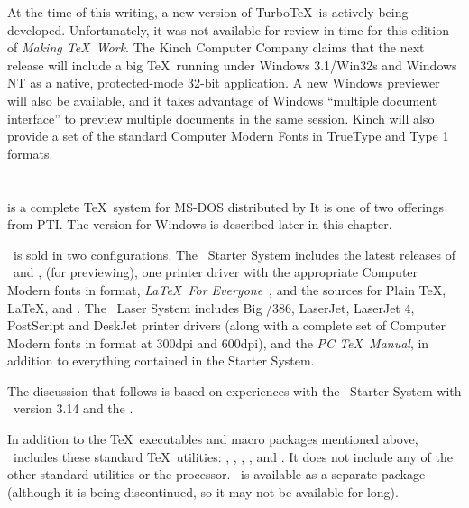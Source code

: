 At the time of this writing, a new version of Turbo\TeX\ is actively being
developed.  Unfortunately, it was not available for review in time for this
edition of \textit{Making \TeX\ Work}.  The Kinch Computer Company claims that
the next release will include a big \TeX\ running under Windows 3.1/Win32s and
Windows NT as a native, protected-mode 32-bit application.  A new Windows
previewer will also be available, and it takes advantage of Windows ``multiple
document interface'' to preview multiple documents in the same session.  Kinch
will also provide a set of the standard Computer Modern Fonts in TrueType and
Type 1 formats.

\section{\protect\PCTeX}
\label{sec:pctex}

 is a complete \TeX\ system for 
MS-DOS distributed by   It is one of two
offerings from PTI.
The version for Windows is described later in this chapter.

\PCTeX\ is sold in two configurations.  The \PCTeX\ Starter System
includes the latest releases of \PCTeX\ and , 
 (for previewing), one printer driver with the appropriate
Computer Modern fonts in  format, {\it \LaTeX\ For
Everyone}~\cite{jh:latexforeveryone}, and the sources for Plain \TeX,
\LaTeX, and \AMSTeX.  The \PCTeX\ Laser System includes Big
\PCTeX/386, LaserJet, LaserJet 4, PostScript and DeskJet printer
drivers (along with a complete set of Computer Modern fonts in 
format at 300dpi and 600dpi), and the {\it PC \TeX\ Manual}, in addition to 
everything contained in the Starter System.

The discussion that follows is based on experiences with the \PCTeX\
Starter System with \PCTeX\ version 3.14 and the  
\dvidriver.

\newpage
In addition to the \TeX\ executables and macro packages mentioned above,
\PCTeX\ includes these standard \TeX\ utilities: , 
\ixx{\program{PLtoTF}}{PLtoTF}, 
, , 
and \ixx{\program{PKtoPX}}{pktopx}.  It does not
include any of the other standard utilities or the 
processor.  \MF\ is available as a separate package (although it is
being discontinued, so it may not be available for long).

